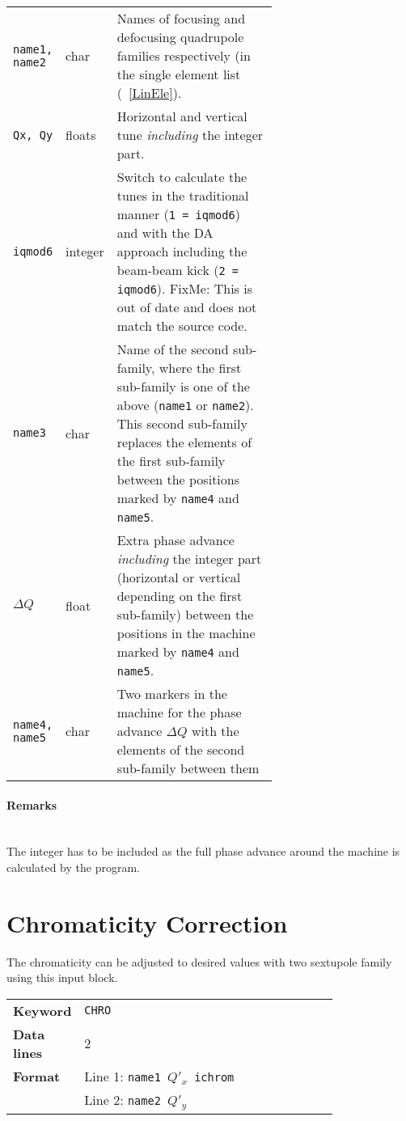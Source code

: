 \bigskip
\begin{longtabu}{@{}llp{0.65\linewidth}}
    \texttt{name1, name2} & char    & Names of focusing and defocusing quadrupole families respectively (in the single element list (~\ref{LinEle}). \\
    \texttt{Qx, Qy}       & floats  & Horizontal and vertical tune \emph{including} the integer part. \\
    \texttt{iqmod6}       & integer & Switch to calculate the tunes in the traditional manner (\texttt{1 = iqmod6}) and with the DA approach including the beam-beam kick (\texttt{2 = iqmod6}). FixMe: This is out of date and does not match the source code. \\
    \texttt{name3}        & char    & Name of the second sub-family, where the first sub-family is one of the above (\texttt{name1} or \texttt{name2}). This second sub-family replaces the elements of the first sub-family between the positions marked by \texttt{name4} and \texttt{name5}. \\
    \texttt{$\Delta Q$}   & float   & Extra phase advance \emph{including} the integer part (horizontal or vertical depending on the first sub-family) between the positions in the machine marked by \texttt{name4} and \texttt{name5}.\\
    \texttt{name4, name5} & char    & Two markers in the machine for the phase advance $\Delta Q$ with the elements of the second sub-family between them
\end{longtabu}

\paragraph{Remarks}~\\

The integer has to be included as the full phase advance around the machine is calculated by the program.

\section{Chromaticity Correction} \label{ChrCor}

The chromaticity can be adjusted to desired values with two sextupole family using this input block.

\bigskip
\begin{tabular}{@{}lp{0.8\linewidth}}
    \textbf{Keyword}    & \texttt{CHRO}\index{CHRO} \\
    \textbf{Data lines} & 2 \\
    \textbf{Format}     & Line 1: \texttt{name1 $Q'_x$ ichrom} \\
                        & Line 2: \texttt{name2 $Q'_y$}
\end{tabular}

